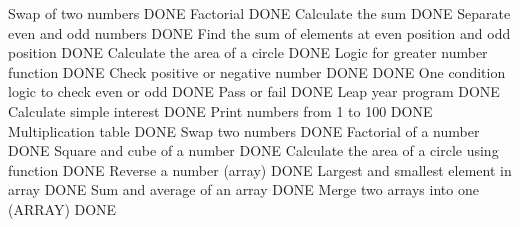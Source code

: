 Swap of two numbers                                                                                DONE                                
Factorial                                                                                          DONE                                                                             
Calculate the sum                                                                                  DONE
Separate even and odd numbers                                                                      DONE
Find the sum of elements at even position and odd position                                         DONE
Calculate the area of a circle                                                                     DONE
Logic for greater number function                                                                  DONE                                                                                       
Check positive or negative number                                                                  DONE                                                                              DONE
One condition logic to check even or odd                                                           DONE                                     
Pass or fail                                                                                       DONE
Leap year program                                                                                  DONE
Calculate simple interest                                                                          DONE
Print numbers from 1 to 100                                                                        DONE
Multiplication table                                                                               DONE
Swap two numbers                                                                                   DONE
Factorial of a number                                                                              DONE
Square and cube of a number                                                                        DONE
Calculate the area of a circle using function                                                      DONE
Reverse a number (array)                                                                           DONE
Largest and smallest element in array                                                              DONE
Sum and average of an array                                                                        DONE
Merge two arrays into one  (ARRAY)                                                                 DONE
